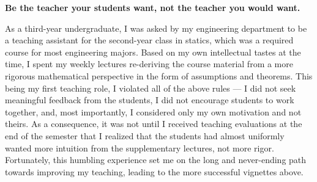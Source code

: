 \textbf{Be the teacher your students want, not the teacher you would want.}

As a third-year undergraduate, I was asked by my engineering department to be a
teaching assistant for the second-year class in statics, which was a required
course for most engineering majors.  Based on my own intellectual tastes at the
time, I spent my weekly lectures re-deriving the course material from a more
rigorous mathematical perspective in the form of assumptions and theorems.  This
being my first teaching role, I violated all of the above rules --- I did not
seek meaningful feedback from the students, I did not encourage students to work
together, and, most importantly, I considered only my own motivation and not
theirs.  As a consequence, it was not until I received teaching evaluations at
the end of the semester that I realized that the students had almost uniformly
wanted more intuition from the supplementary lectures, not more rigor.
Fortunately, this humbling experience set me on the long  and never-ending path
towards improving my teaching, leading to the more successful vignettes above.



